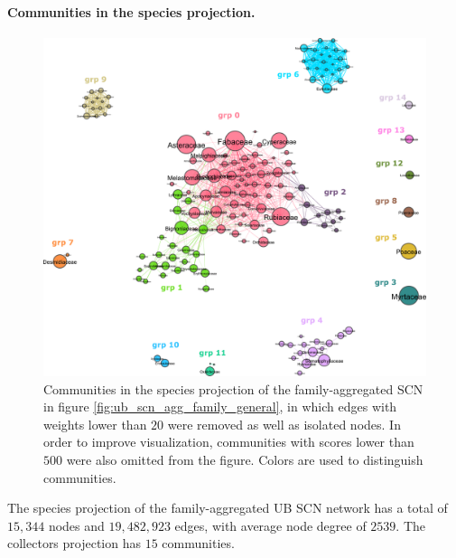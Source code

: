 \paragraph*{Communities in the species projection.}
\begin{figure}[!ht]
  	\centering
    \includegraphics[width=\linewidth]{figures/casestudy_ub/scn_family_projSp_communities.pdf}
    \caption{ Communities in the species projection of the family-aggregated SCN in figure \ref{fig:ub_scn_agg_family_general}, in which edges with weights lower than $20$ were removed as well as isolated nodes. In order to improve visualization, communities with scores lower than $500$ were also omitted from the figure. Colors are used to distinguish communities.}
    \label{fig:ub_scn_family_projSp_communities}
\end{figure}
The species projection of the family-aggregated UB SCN network has a total of $15,344$ nodes and $19,482,923$ edges, with average node degree of $2539$.
The collectors projection has $15$ communities.











